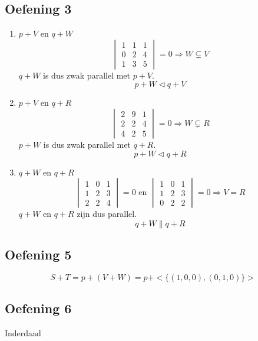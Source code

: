 \documentclass[main.tex]{subfiles}
\begin{document}
\subsection*{Oefening 3}
\begin{enumerate}
\item $p+V$ en $q+W$
  \[
  \begin{vmatrix}
    1 & 1 & 1\\
    0 & 2 & 4\\
    1 & 3 & 5
  \end{vmatrix}
  = 0
  \Rightarrow W \subsetneq V 
  \]
  $q+W$ is dus zwak parallel met $p+V$.
  \[ p+W \triangleleft q+V \]
\item $p+V$ en $q+R$
  \[
  \begin{vmatrix}
    2 & 9 & 1\\
    2 & 2 & 4\\
    4 & 2 & 5
  \end{vmatrix}
  = 0
  \Rightarrow W \subsetneq R 
  \]
  $p+W$ is dus zwak parallel met $q+R$.
  \[ p+W \triangleleft q+R \]
  
\item $q+W$ en $q+R$
  \[
  \begin{vmatrix}
    1 & 0 & 1\\
    1 & 2 & 3\\
    2 & 2 & 4
  \end{vmatrix}
  = 0
  \text{ en }
  \begin{vmatrix}
    1 & 0 & 1\\
    1 & 2 & 3\\
    0 & 2 & 2
  \end{vmatrix}
  = 0
  \Rightarrow V = R
  \]
  $q+W$ en $q+R$ zijn dus parallel.
  \[ q+W \parallel q+R \]
\end{enumerate}


\subsection*{Oefening 5}
\[ S + T = p + (V + W) = p + <\{(1,0,0),(0,1,0)\}>\]

\subsection*{Oefening 6}
Inderdaad 
\end{document}
